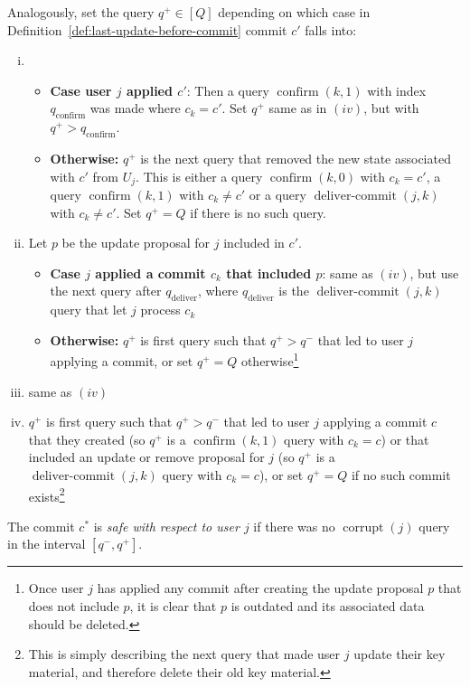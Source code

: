 \begin{definition}
	Analogously, set the query $q^+ \in [Q]$ depending on which case in Definition~\ref{def:last-update-before-commit} commit $c'$ falls into:
	\begin{enumerate}[(i)]
		\item \begin{itemize}
			      \item \textbf{Case user $j$ applied $c'$}: Then a query $\operatorname{confirm}(k, 1)$ with index $q_{\mathrm{confirm}}$ was made where $c_k = c'$. Set $q^+$ same as in $(iv)$, but with $q^+ > q_{\mathrm{confirm}}$.
			      \item \textbf{Otherwise:} $q^+$ is the next query that removed the new state associated with $c'$ from $U_j$. This is either a query $\operatorname{confirm}(k, 0)$ with $c_k = c'$, a query $\operatorname{confirm}(k, 1)$ with $c_k \neq c'$ or a query $\operatorname{deliver-commit}(j, k)$ with $c_k \neq c'$. Set $q^+ = Q$ if there is no such query.
		      \end{itemize}
		\item Let $p$ be the update proposal for $j$ included in $c'$.
		      \begin{itemize}
			      \item \textbf{Case $j$ applied a commit $c_k$ that included $p$}: same as $(iv)$, but use the next query after $q_{\mathrm{deliver}}$, where $q_{\mathrm{deliver}}$ is the $\operatorname{deliver-commit}(j, k)$ query that let $j$ process $c_k$
			      \item \textbf{Otherwise:} $q^+$ is first query such that $q^+ > q^-$ that led to user $j$ applying a commit, or set $q^+ = Q$ otherwise\footnote{Once user $j$ has applied any commit after creating the update proposal $p$ that does not include $p$, it is clear that $p$ is outdated and its associated data should be deleted.}
		      \end{itemize}
		\item same as $(iv)$
		\item $q^+$ is first query such that $q^+ > q^-$ that led to user $j$ applying a commit $c$ that they created (so $q^+$ is a $\operatorname{confirm}(k, 1)$ query with $c_k = c$) or that included an update or remove proposal for $j$ (so $q^+$ is a $\operatorname{deliver-commit}(j, k)$ query with $c_k = c$), or set $q^+ = Q$ if no such commit exists\footnote{This is simply describing the next query that made user $j$ update their key material, and therefore delete their old key material.}
	\end{enumerate}

	The commit $c^*$ is \emph{safe with respect to user $j$} if there was no $\operatorname{corrupt}(j)$ query in the interval $[q^-, q^+]$.
\end{definition}

